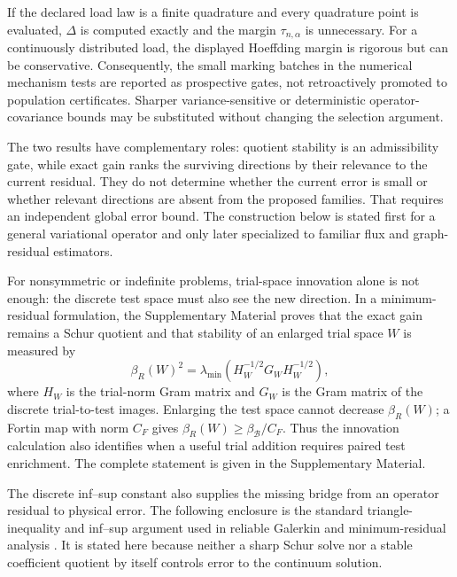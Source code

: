 \documentclass[11pt]{article}
\numberwithin{algorithm}{section}
\theoremstyle{definition}\newtheorem{definition}[theorem]{Definition}
\theoremstyle{remark}\newtheorem{remark}[theorem]{Remark}
\begin{document}
If the declared load law is a finite quadrature and every quadrature point is
evaluated, $\Delta$ is computed exactly and the margin
$\tau_{n,\alpha}$ is unnecessary.  For a continuously distributed load, the
displayed Hoeffding margin is rigorous but can be conservative.  Consequently,
the small marking batches in the numerical mechanism tests are reported as
prospective gates, not retroactively promoted to population certificates.
Sharper variance-sensitive or deterministic operator-covariance bounds may be
substituted without changing the selection argument.

The two results have complementary roles: quotient stability is an
admissibility gate, while exact gain ranks the surviving directions by their
relevance to the current residual.  They do not determine whether the current
error is small or whether relevant directions are absent from the proposed
families.  That requires an independent global error bound.  The construction
below is stated first for a general variational operator and only later
specialized to familiar flux and graph-residual estimators.

For nonsymmetric or indefinite problems, trial-space innovation alone is not
enough: the discrete test space must also see the new direction. In a
minimum-residual formulation, the Supplementary Material proves that
the exact gain remains a Schur quotient and that stability of an enlarged
trial space $W$ is measured by
\begin{equation}
 \beta_R(W)^2=\lambda_{\min}(H_W^{-1/2}G_WH_W^{-1/2}),
 \label{eq:main-discrete-infsup}
\end{equation}
where $H_W$ is the trial-norm Gram matrix and $G_W$ is the Gram matrix of the
discrete trial-to-test images. Enlarging the test space cannot decrease
$\beta_R(W)$; a Fortin map with norm $C_F$ gives
$\beta_R(W)\geq\beta_{\mathcal B}/C_F$. Thus the innovation calculation also
identifies when a useful trial addition requires paired test enrichment. The
complete statement is given in the Supplementary Material.

The discrete inf--sup constant also supplies the missing bridge from an
operator residual to physical error.  The following enclosure is the standard
triangle-inequality and inf--sup argument used in reliable Galerkin and
minimum-residual analysis \cite{demkowiczgopalakrishnan2011,ciarlet1978}.  It
is stated here because neither a sharp Schur solve nor
a stable coefficient quotient by itself controls error to the continuum
solution.
\end{document}

